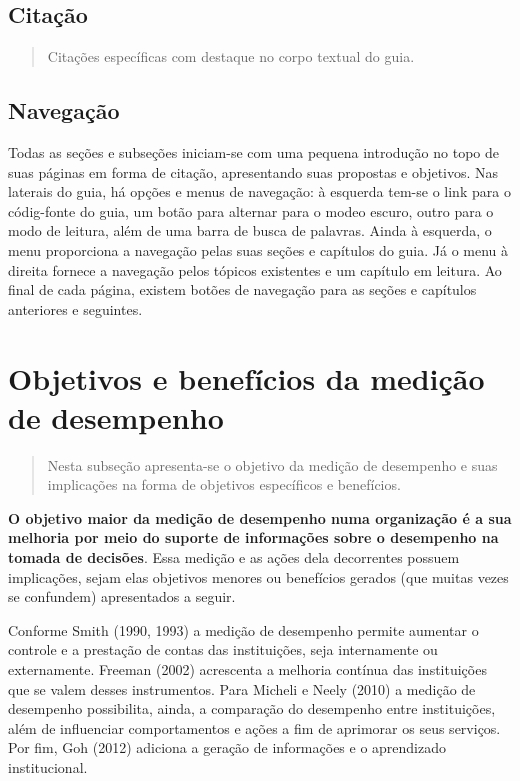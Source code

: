\documentclass[
  letterpaper,
  DIV=11,
  numbers=noendperiod]{scrreprt}
\begin{document}
\hypertarget{citauxe7uxe3o}{%
\section{Citação}\label{citauxe7uxe3o}}

\begin{quote}
Citações específicas com destaque no corpo textual do guia.
\end{quote}

\hypertarget{navegauxe7uxe3o}{%
\section{Navegação}\label{navegauxe7uxe3o}}

Todas as seções e subseções iniciam-se com uma pequena introdução no
topo de suas páginas em forma de citação, apresentando suas propostas e
objetivos. Nas laterais do guia, há opções e menus de navegação: à
esquerda tem-se o link para o códig-fonte do guia, um botão para
alternar para o modeo escuro, outro para o modo de leitura, além de uma
barra de busca de palavras. Ainda à esquerda, o menu proporciona a
navegação pelas suas seções e capítulos do guia. Já o menu à direita
fornece a navegação pelos tópicos existentes e um capítulo em leitura.
Ao final de cada página, existem botões de navegação para as seções e
capítulos anteriores e seguintes.

\hypertarget{objetivos-e-benefuxedcios-da-mediuxe7uxe3o-de-desempenho}{%
\chapter{Objetivos e benefícios da medição de
desempenho}\label{objetivos-e-benefuxedcios-da-mediuxe7uxe3o-de-desempenho}}

\begin{quote}
Nesta subseção apresenta-se o objetivo da medição de desempenho e suas
implicações na forma de objetivos específicos e benefícios.
\end{quote}

\textbf{O objetivo maior da medição de desempenho numa organização é a
sua melhoria por meio do suporte de informações sobre o desempenho na
tomada de decisões}. Essa medição e as ações dela decorrentes possuem
implicações, sejam elas objetivos menores ou benefícios gerados (que
muitas vezes se confundem) apresentados a seguir.

Conforme Smith (1990, 1993) a medição de desempenho permite aumentar o
controle e a prestação de contas das instituições, seja internamente ou
externamente. Freeman (2002) acrescenta a melhoria contínua das
instituições que se valem desses instrumentos. Para Micheli e Neely
(2010) a medição de desempenho possibilita, ainda, a comparação do
desempenho entre instituições, além de influenciar comportamentos e
ações a fim de aprimorar os seus serviços. Por fim, Goh (2012) adiciona
a geração de informações e o aprendizado institucional.
\end{document}

